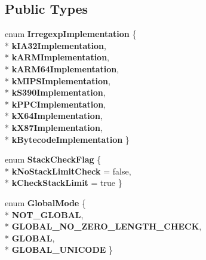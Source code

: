 \subsection*{Public Types}
\begin{DoxyCompactItemize}
\item 
enum {\bfseries Irregexp\+Implementation} \{ \\*
{\bfseries k\+I\+A32\+Implementation}, 
\\*
{\bfseries k\+A\+R\+M\+Implementation}, 
\\*
{\bfseries k\+A\+R\+M64\+Implementation}, 
\\*
{\bfseries k\+M\+I\+P\+S\+Implementation}, 
\\*
{\bfseries k\+S390\+Implementation}, 
\\*
{\bfseries k\+P\+P\+C\+Implementation}, 
\\*
{\bfseries k\+X64\+Implementation}, 
\\*
{\bfseries k\+X87\+Implementation}, 
\\*
{\bfseries k\+Bytecode\+Implementation}
 \}\hypertarget{classv8_1_1internal_1_1_reg_exp_macro_assembler_aa25bfd5e513b3364931b82afd32f087d}{}\label{classv8_1_1internal_1_1_reg_exp_macro_assembler_aa25bfd5e513b3364931b82afd32f087d}

\item 
enum {\bfseries Stack\+Check\+Flag} \{ \\*
{\bfseries k\+No\+Stack\+Limit\+Check} = false, 
\\*
{\bfseries k\+Check\+Stack\+Limit} = true
 \}\hypertarget{classv8_1_1internal_1_1_reg_exp_macro_assembler_a91a9710d7239b05c338264daf2730f3b}{}\label{classv8_1_1internal_1_1_reg_exp_macro_assembler_a91a9710d7239b05c338264daf2730f3b}

\item 
enum {\bfseries Global\+Mode} \{ \\*
{\bfseries N\+O\+T\+\_\+\+G\+L\+O\+B\+AL}, 
\\*
{\bfseries G\+L\+O\+B\+A\+L\+\_\+\+N\+O\+\_\+\+Z\+E\+R\+O\+\_\+\+L\+E\+N\+G\+T\+H\+\_\+\+C\+H\+E\+CK}, 
\\*
{\bfseries G\+L\+O\+B\+AL}, 
\\*
{\bfseries G\+L\+O\+B\+A\+L\+\_\+\+U\+N\+I\+C\+O\+DE}
 \}\hypertarget{classv8_1_1internal_1_1_reg_exp_macro_assembler_a8c5dd9fba6bb0f236a08e824e5b83198}{}\label{classv8_1_1internal_1_1_reg_exp_macro_assembler_a8c5dd9fba6bb0f236a08e824e5b83198}

\end{DoxyCompactItemize}
